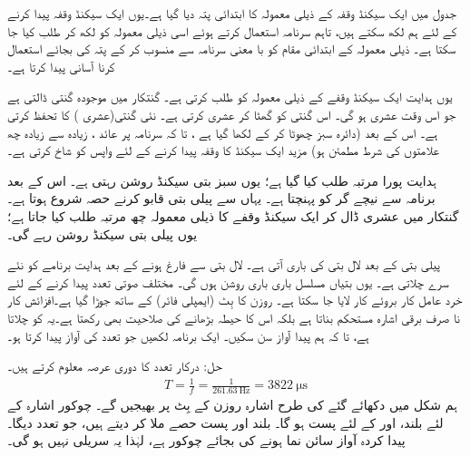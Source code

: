 جدول  میں ایک سیکنڈ وقفہ کے ذیلی معمولہ کا ابتدائی پتہ  دیا گیا ہے۔یوں ایک سیکنڈ وقفہ پیدا کرنے کے لئے ہم  لکھ سکتے ہیں، تاہم سرنامہ استعمال کرتے ہوئے اسی ذیلی معمولہ کو  لکھ کر  طلب کیا جا سکتا ہے۔ ذیلی معمولہ کے ابتدائی مقام کو با  معنی   سرنامہ  سے منسوب کر کے پتہ کی بجائے استعمال کرنا  آسانی پیدا کرتا ہے۔

یوں  ہدایت  ایک سیکنڈ وقفے کے ذیلی معمولہ کو طلب  کرتی ہے۔ گنتکار میں موجودہ گنتی ڈالتی ہے جو اس وقت  عشری  ہو گی۔ \DCR{\regA} اس گنتی کو گھٹا کر عشری  کرتی ہے۔   نئی گنتی(عشری   ) کا تحفظ کرتی ہے۔ اس کے بعد  (دائرہ سبز چھوٹا کر کے لکھا گیا ہے ، تا کہ سرنامہ پر عائد ، زیادہ سے زیادہ  چھ علامتوں کی شرط مطمئن  ہو)  مزید ایک سیکنڈ کا  وقفہ پیدا کرنے کے لئے واپس  کو شاخ کرتی ہے۔

ہدایت  پورا  مرتبہ طلب کیا گیا ہے؛ یوں سبز بتی  سیکنڈ روشن  رہتی ہے۔ اس کے بعد برنامہ  سے نیچے گر کو   پہنچتا ہے۔ یہاں سے پیلی بتی قابو کرنے حصہ  شروع ہوتا ہے۔ گنتکار  میں عشری  ڈال کر ایک سیکنڈ وقفے کا ذیلی معمولہ  چھ مرتبہ طلب کیا جاتا ہے؛ یوں پیلی بتی  سیکنڈ روشن رہے گی۔

پیلی بتی کے بعد لال بتی کی باری آتی ہے۔ لال بتی  سے فارغ ہونے کے بعد  ہدایت  برنامے کو نئے سرے  چلاتی ہے۔ یوں بتیاں مسلسل باری باری روشن ہوں گی۔
 مختلف صوتی تعدد   پیدا کرنے کے لئے  خرد عامل کار بروئے کار لایا  جا سکتا ہے۔ روزن  کا بِٹ  (ایمپلی فائر)  کے ساتھ  جوڑا گیا ہے۔افزائش کار نا صرف برقی اشارہ مستحکم بناتا ہے بلکہ اس کا حیطہ بڑھانے کی صلاحیت بھی رکھتا ہے۔یہ     کو چلاتا ہے، تا کہ ہم  پیدا آواز  سن سکیں۔ ایک برنامہ لکھیں جو  تعدد کی آواز پیدا کرتا ہو۔

حل:\quad
درکار تعدد کا دوری عرصہ معلوم کرتے ہیں۔
\begin{align*}
T=\frac{1}{f}=\frac{1}{\SI{261.63}{\hertz}}=\SI{3822}{\micro\second}
\end{align*}
ہم شکل   میں دکھائے گئے کی  طرح  اشارہ  روزن  کے بِٹ  پر بھیجیں گے۔  چوکور اشارہ  کے لئے بلند، اور  کے لئے پست ہو گا۔ بلند اور پست حصے ملا کر  دیتے ہیں، جو  تعدد دیگا۔  پیدا کردہ  آواز سائن نما ہونے کی بجائے چوکور ہے، لہٰذا  یہ  سریلی  نہیں ہو گی۔

